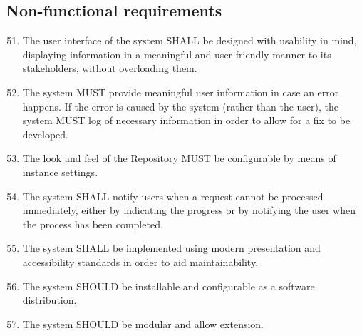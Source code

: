 \subsection{Non-functional requirements}
\label{nonFunctionalRequirements}
\begin{enumerate}[1]
\setcounter{enumi}{50}

\item The user interface of the system SHALL be designed with usability in mind, displaying information in a meaningful and user-friendly manner to its stakeholders, without overloading them.

\item The system MUST provide meaningful user information in case an error happens. If the error is caused by the system (rather than the user), the system MUST log of necessary information in order to allow for a fix to be developed.

\item The look and feel of the Repository MUST be configurable by means of instance settings.

\item The system SHALL notify users when a request cannot be processed immediately, either by indicating the progress or by notifying the user when the process has been completed.

\item The system SHALL be implemented using modern presentation and accessibility standards in order to aid maintainability.

\item The system SHOULD be installable and configurable as a software distribution.

\item The system SHOULD be modular and allow extension.
\end{enumerate}
